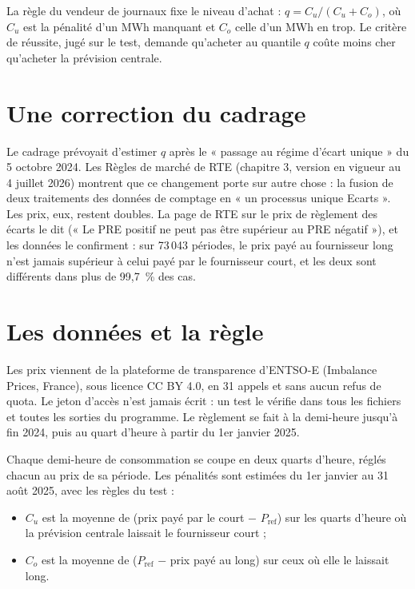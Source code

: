 \documentclass[11pt,a4paper]{article}
\begin{document}
La règle du vendeur de journaux fixe le niveau d'achat : $q = C_u / (C_u + C_o)$, où $C_u$ est la pénalité d'un MWh manquant et $C_o$ celle d'un MWh en trop. Le critère de réussite, jugé sur le test, demande qu'acheter au quantile $q$ coûte moins cher qu'acheter la prévision centrale.

\section{Une correction du cadrage}

Le cadrage prévoyait d'estimer $q$ après le « passage au régime d'écart unique » du 5 octobre 2024. Les Règles de marché de RTE (chapitre 3, version en vigueur au 4 juillet 2026) montrent que ce changement porte sur autre chose : la fusion de deux traitements des données de comptage en « un processus unique Ecarts ». Les prix, eux, restent doubles. La page de RTE sur le prix de règlement des écarts le dit (« Le PRE positif ne peut pas être supérieur au PRE négatif »), et les données le confirment : sur 73\,043 périodes, le prix payé au fournisseur long n'est jamais supérieur à celui payé par le fournisseur court, et les deux sont différents dans plus de 99,7~\% des cas.

\section{Les données et la règle}

Les prix viennent de la plateforme de transparence d'ENTSO-E (Imbalance Prices, France), sous licence CC BY 4.0, en 31 appels et sans aucun refus de quota. Le jeton d'accès n'est jamais écrit : un test le vérifie dans tous les fichiers et toutes les sorties du programme. Le règlement se fait à la demi-heure jusqu'à fin 2024, puis au quart d'heure à partir du 1er janvier 2025.

Chaque demi-heure de consommation se coupe en deux quarts d'heure, réglés chacun au prix de sa période. Les pénalités sont estimées du 1er janvier au 31 août 2025, avec les règles du test :

\begin{itemize}
  \item $C_u$ est la moyenne de (prix payé par le court $-$ $P_{\text{ref}}$) sur les quarts d'heure où la prévision centrale laissait le fournisseur court ;
  \item $C_o$ est la moyenne de ($P_{\text{ref}}$ $-$ prix payé au long) sur ceux où elle le laissait long.
\end{itemize}
\end{document}
